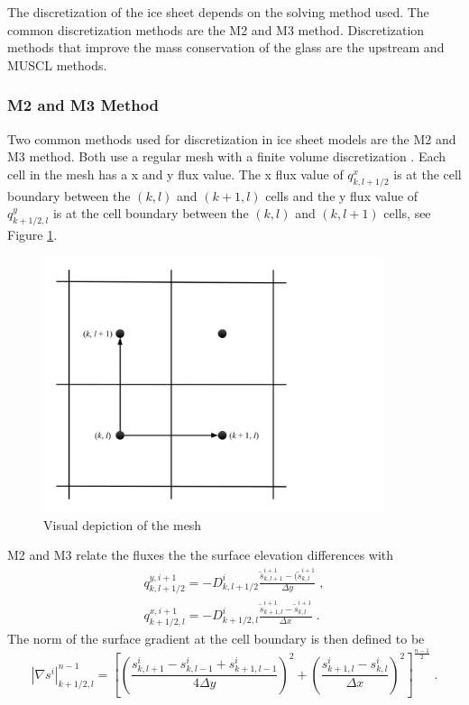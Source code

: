 \documentclass{article}
\begin{document}
The discretization of the ice sheet depends on the solving method used. The common discretization methods are the M2 and M3 method. Discretization methods that improve the mass conservation of the glass are the upstream and MUSCL methods.

\subsubsection{M2 and M3 Method}
Two common methods used for discretization in ice sheet models are the M2 and M3 method. Both use a regular mesh with a finite volume discretization \citep{Jarosch2013,Hindmarsh1996,Huybrechts1996}.  Each cell in the mesh has a x and y flux value. The x flux value of $q^x_{k, l+1/2}$  is at the cell boundary between the $(k,l)$ and $(k+1,l) $ cells and the y flux value of $q^y_{k+1/2, l}$ is at the cell boundary between the $(k,l)$ and $(k,l+1)$ cells, see Figure \ref{fig:Grid}. 
\begin{figure}[H]
    \centering
    \includegraphics[width=10cm]{Grid.jpg}
    \caption{Visual depiction of the mesh}
    \label{fig:Grid}
\end{figure}
M2 and M3 relate the fluxes the the surface elevation differences with
\begin{subequations}
\begin{gather}
    q^{y, i+1}_{k, l+1/2}=-D^i_{k, l+1/2}\frac{\tilde{s}^{i+1}_{k, l+1}-(\tilde{s}^{i+1}_{k, l}}{\Delta y} \; , \\
    q^{x, i+1}_{k+1/2, l}=-D^i_{k+1/2, l}\frac{\tilde{s}^{i+1}_{k+1, l}-\tilde{s}^{i+1}_{k, l}}{\Delta x} \; .
\end{gather}
\end{subequations}
The norm of the surface gradient at the cell boundary is then defined to be 
\begin{equation}
    |\nabla s ^i|^{n-1}_{k+1/2,l} = \left[\left( \frac{s^i_{k,l+1}-s^i_{k,l-1}+s^i_{k+1,l-1}}{4\Delta y}\right)^2+\left( \frac{s^i_{k+1,l}-s^i_{k,l}}{\Delta x}\right)^2 \right]^{\frac{n-1}{2}} \; .
\end{equation}
\end{document}
